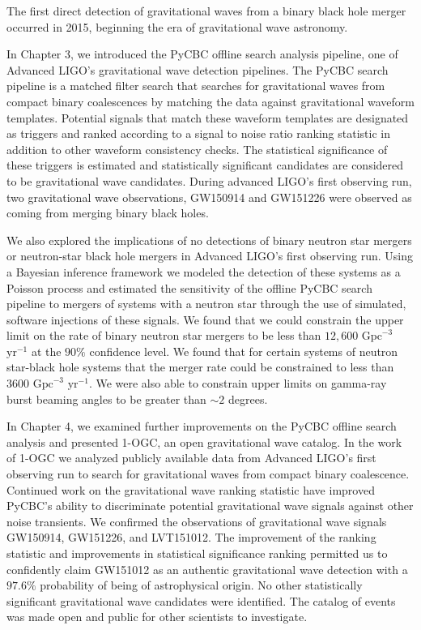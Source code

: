 The first direct detection of gravitational waves from a binary black hole merger occurred in 2015, beginning the era of gravitational wave astronomy. 

In Chapter 3, we introduced the PyCBC offline search analysis pipeline, one of Advanced LIGO's gravitational wave detection pipelines. The PyCBC search pipeline is a matched filter search that searches for gravitational waves from compact binary coalescences by matching the data against gravitational waveform templates. Potential signals that match these waveform templates are designated as triggers and ranked according to a signal to noise ratio ranking statistic in addition to other waveform consistency checks. The statistical significance of these triggers is estimated and statistically significant candidates are considered to be gravitational wave candidates. During advanced LIGO's first observing run, two gravitational wave observations, GW150914 and GW151226 were observed as coming from merging binary black holes.

We also explored the implications of no detections of binary neutron star mergers or neutron-star black hole mergers in Advanced LIGO's first observing run. Using a Bayesian inference framework we modeled the detection of these systems as a Poisson process and estimated the sensitivity of the offline PyCBC search pipeline to mergers of systems with a neutron star through the use of simulated, software injections of these signals. We found that we could constrain the upper limit on the rate of binary neutron star mergers to be less than $12,600$ $\mathrm{Gpc}^{-3}$ $\mathrm{yr}^{-1}$ at the $90 \%$ confidence level. We found that for certain systems of neutron star-black hole systems that the merger rate could be constrained to less than $3600$ $\mathrm{Gpc}^{-3}$ $\mathrm{yr}^{-1}$. We were also able to constrain upper limits on gamma-ray burst beaming angles to be greater than $\sim 2$ degrees.

In Chapter 4, we examined further improvements on the PyCBC offline search analysis and presented 1-OGC, an open gravitational wave catalog. In the work of 1-OGC we analyzed publicly available data from Advanced LIGO's first observing run to search for gravitational waves from compact binary coalescence. Continued work on the gravitational wave ranking statistic have improved PyCBC's ability to discriminate potential gravitational wave signals against other noise transients. We confirmed the observations of gravitational wave signals GW150914, GW151226, and LVT151012. The improvement of the ranking statistic and improvements in statistical significance ranking permitted us to confidently claim GW151012 as an authentic gravitational wave detection with a $97.6 \%$ probability of being of astrophysical origin. No other statistically significant gravitational wave candidates were identified. The catalog of events was made open and public for other scientists to investigate. 

